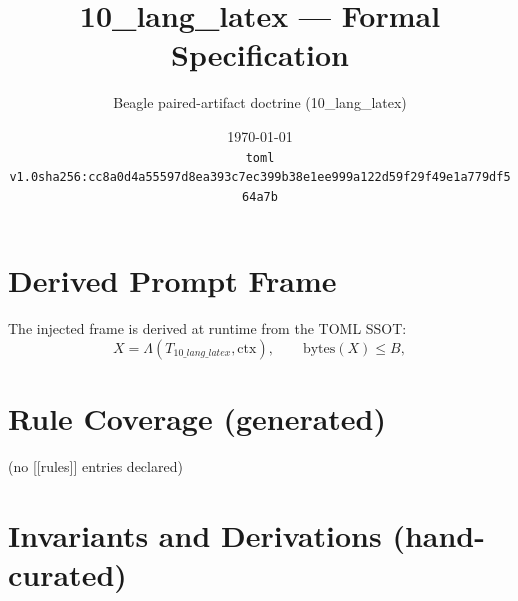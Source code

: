 \documentclass[11pt]{article}
\title{10\_lang\_latex --- Formal Specification}
\author{Beagle paired-artifact doctrine (10\_lang\_latex)}
\date{\today\\ \texttt{toml v1.0\quad sha256:cc8a0d4a55597d8ea393c7ec399b38e1ee999a122d59f29f49e1a779df564a7b}}
\begin{document}
\maketitle

\section{Derived Prompt Frame}
The injected frame is derived at runtime from the TOML SSOT:
\begin{equation}
  X = \Lambda(T_{10\_lang\_latex}, \mathrm{ctx}), \qquad \mathrm{bytes}(X) \le B,
  \label{lbl:derive-frame}
\end{equation}

\section{Rule Coverage (generated)}
(no [[rules]] entries declared)

\section{Invariants and Derivations (hand-curated)}
\end{document}
